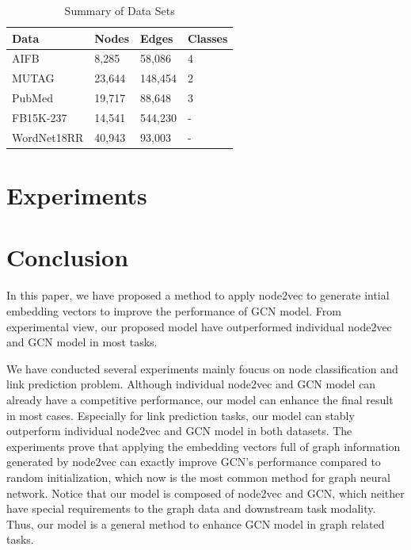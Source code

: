 \documentclass[sigconf]{acmart}
\begin{document}
\begin{table}[!ht]
    \centering
    \caption{Summary of Data Sets}
    \label{tab:5-data}
    \begin{tabular}{llll}
        \toprule
        \textbf{Data} & \textbf{Nodes} & \textbf{Edges} & \textbf{Classes} \\
        \midrule
        AIFB & 8,285 & 58,086 & 4\\
        MUTAG & 23,644 & 148,454 & 2\\
        PubMed & 19,717 & 88,648 & 3\\
        FB15K-237 & 14,541 & 544,230 & -\\
        WordNet18RR & 40,943 & 93,003 & -\\
        \bottomrule
    \end{tabular}
\end{table}

\section{Experiments}


\section{Conclusion}
In this paper, we have proposed a method to apply node2vec to generate intial embedding vectors to improve the performance of GCN model. From experimental view, our proposed model have outperformed individual node2vec and GCN model in most tasks. 

We have conducted several experiments mainly foucus on node classification and link prediction problem. Although individual node2vec and GCN model can already have a competitive performance, our model can enhance the final result in most cases. Especially for link prediction tasks, our model can stably outperform individual node2vec and GCN model in both datasets. The experiments prove that applying the embedding vectors full of graph information generated by node2vec can exactly improve GCN's performance compared to random initialization, which now is the most common method for graph neural network. Notice that our model is composed of node2vec and GCN, which neither have special requirements to the graph data and downstream task modality. Thus, our model is a general method to enhance GCN model in graph related tasks.
\end{document}
